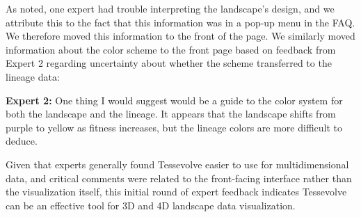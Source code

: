 As noted, one expert had trouble interpreting the landscape's design, and we attribute this to the fact that this information was in a pop-up menu in the FAQ. We therefore moved this information to the front of the page. We similarly moved information about the color scheme to the front page based on feedback from Expert 2 regarding uncertainty about whether the scheme transferred to the lineage data:

\begin{displayquote}

\textbf{Expert 2:} One thing I would suggest would be a guide to the color system for both the landscape and the lineage. It appears that the landscape shifts from purple to yellow as fitness increases, but the lineage colors are more difficult to deduce. 

\end{displayquote}

Given that experts generally found Tessevolve easier to use for multidimensional data, and critical comments were related to the front-facing interface rather than the visualization itself, this initial round of expert feedback indicates Tessevolve can be an effective tool for 3D and 4D landscape data visualization.